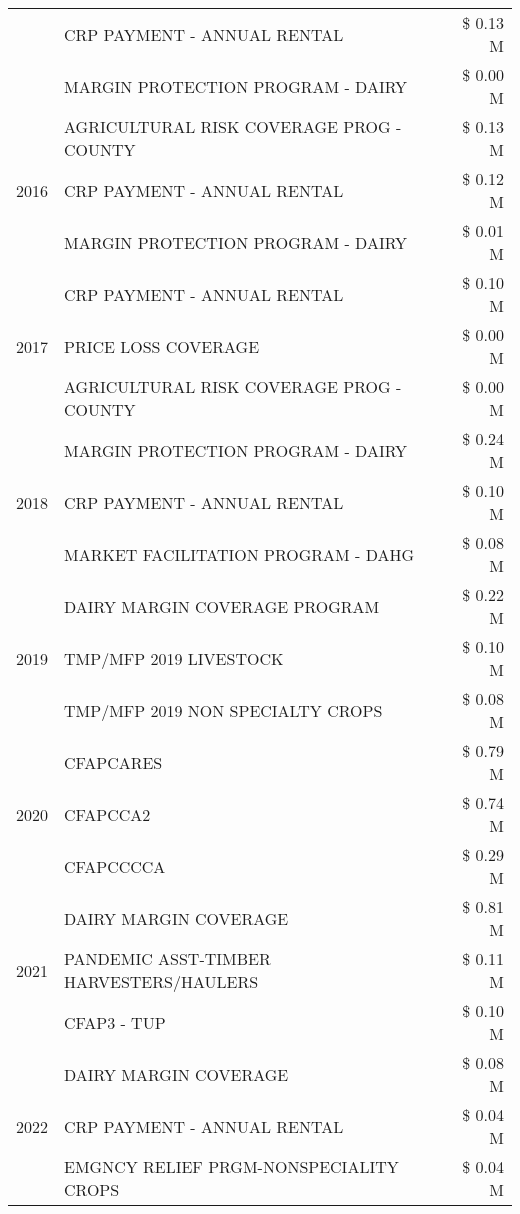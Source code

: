 \begin{tabular}{llr}
 & CRP PAYMENT - ANNUAL RENTAL & \$ 0.13 M \\
 & MARGIN PROTECTION PROGRAM - DAIRY & \$ 0.00 M \\
\cline{1-3}
\multirow[t]{3}{*}{2016} & AGRICULTURAL RISK COVERAGE PROG - COUNTY & \$ 0.13 M \\
 & CRP PAYMENT - ANNUAL RENTAL & \$ 0.12 M \\
 & MARGIN PROTECTION PROGRAM - DAIRY & \$ 0.01 M \\
\cline{1-3}
\multirow[t]{3}{*}{2017} & CRP PAYMENT - ANNUAL RENTAL & \$ 0.10 M \\
 & PRICE LOSS COVERAGE & \$ 0.00 M \\
 & AGRICULTURAL RISK COVERAGE PROG - COUNTY & \$ 0.00 M \\
\cline{1-3}
\multirow[t]{3}{*}{2018} & MARGIN PROTECTION PROGRAM - DAIRY & \$ 0.24 M \\
 & CRP PAYMENT - ANNUAL RENTAL & \$ 0.10 M \\
 & MARKET FACILITATION PROGRAM - DAHG & \$ 0.08 M \\
\cline{1-3}
\multirow[t]{3}{*}{2019} & DAIRY MARGIN COVERAGE PROGRAM & \$ 0.22 M \\
 & TMP/MFP 2019 LIVESTOCK & \$ 0.10 M \\
 & TMP/MFP 2019 NON SPECIALTY CROPS & \$ 0.08 M \\
\cline{1-3}
\multirow[t]{3}{*}{2020} & CFAPCARES & \$ 0.79 M \\
 & CFAPCCA2 & \$ 0.74 M \\
 & CFAPCCCCA & \$ 0.29 M \\
\cline{1-3}
\multirow[t]{3}{*}{2021} & DAIRY MARGIN COVERAGE & \$ 0.81 M \\
 & PANDEMIC ASST-TIMBER HARVESTERS/HAULERS & \$ 0.11 M \\
 & CFAP3 - TUP & \$ 0.10 M \\
\cline{1-3}
\multirow[t]{3}{*}{2022} & DAIRY MARGIN COVERAGE & \$ 0.08 M \\
 & CRP PAYMENT - ANNUAL RENTAL & \$ 0.04 M \\
 & EMGNCY RELIEF PRGM-NONSPECIALITY CROPS & \$ 0.04 M \\
\cline{1-3}
\bottomrule
\end{tabular}

